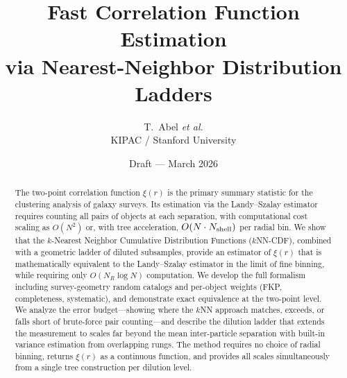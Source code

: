 \documentclass[11pt]{article}
\title{Fast Correlation Function Estimation\\via Nearest-Neighbor Distribution Ladders}
\author{T.\ Abel \textit{et al.}\\KIPAC / Stanford University}
\date{Draft --- March 2026}
\newcommand{\knn}{$k$NN}
\begin{document}
\maketitle

\begin{abstract}
The two-point correlation function $\xi(r)$ is the primary summary statistic for the clustering analysis of galaxy surveys.  Its estimation via the Landy--Szalay estimator requires counting all pairs of objects at each separation, with computational cost scaling as $O(N^2)$ or, with tree acceleration, $O(N \cdot N_{\rm shell})$ per radial bin.  We show that the $k$-Nearest Neighbor Cumulative Distribution Functions (\knn{}-CDF), combined with a geometric ladder of diluted subsamples, provide an estimator of $\xi(r)$ that is mathematically equivalent to the Landy--Szalay estimator in the limit of fine binning, while requiring only $O(N_R \log N)$ computation.  We develop the full formalism including survey-geometry random catalogs and per-object weights (FKP, completeness, systematic), and demonstrate exact equivalence at the two-point level.  We analyze the error budget---showing where the \knn{} approach matches, exceeds, or falls short of brute-force pair counting---and describe the dilution ladder that extends the measurement to scales far beyond the mean inter-particle separation with built-in variance estimation from overlapping rungs.  The method requires no choice of radial binning, returns $\xi(r)$ as a continuous function, and provides all scales simultaneously from a single tree construction per dilution level.
\end{abstract}

\tableofcontents












\end{document}

